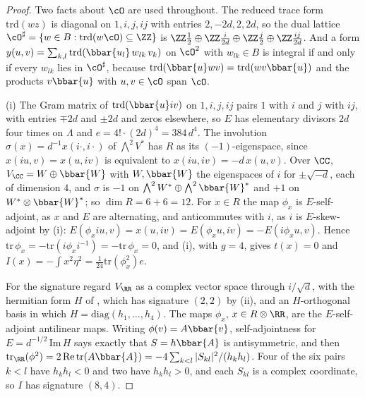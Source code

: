 \begin{proof}
Two facts about $\cO$ are used throughout. The reduced trace form
$\mathrm{trd}(wz)$ is diagonal on $1,i,j,ij$ with entries $2,-2d,2,2d$, so
the dual lattice $\cO^{\sharp}=\{w\in B:\mathrm{trd}(w\cO)\subseteq\ZZ\}$ is
$\ZZ\tfrac12\oplus\ZZ\tfrac{i}{2d}\oplus\ZZ\tfrac{j}{2}\oplus\ZZ\tfrac{ij}{2d}$.
And a form $y(u,v)=\sum_{k,l}\mathrm{trd}(\bbar{u_{l}}\,w_{lk}\,v_{k})$ on
$\cO^{2}$ with $w_{lk}\in B$ is integral if and only if every $w_{lk}$ lies
in $\cO^{\sharp}$, because $\mathrm{trd}(\bbar{u}wv)=\mathrm{trd}(wv\bbar{u})$
and the products $v\bbar{u}$ with $u,v\in\cO$ span $\cO$.

(i) The Gram matrix of $\mathrm{trd}(\bbar{u}iv)$ on $1,i,j,ij$ pairs $1$
with $i$ and $j$ with $ij$, with entries $\mp2d$ and $\pm2d$ and zeros
elsewhere, so $E$ has elementary divisors $2d$ four times on $\Lambda$ and
$e=4!\cdot(2d)^{4}=384\,d^{4}$. The involution $\sigma(x)=d^{-1}x(i\cdot,i\cdot)$
of $\bigwedge^{2}V^{*}$ has $R$ as its $(-1)$-eigenspace, since
$x(iu,v)=x(u,iv)$ is equivalent to $x(iu,iv)=-d\,x(u,v)$. Over $\CC$,
$V_{\CC}=W\oplus\bbar{W}$ with $W,\bbar{W}$ the eigenspaces of $i$ for
$\pm\sqrt{-d}$, each of dimension $4$, and $\sigma$ is $-1$ on
$\bigwedge^{2}W^{*}\oplus\bigwedge^{2}\bbar{W}^{*}$ and $+1$ on
$W^{*}\otimes\bbar{W}^{*}$; so $\dim R=6+6=12$. For $x\in R$ the map
$\phi_{x}$ is $E$-self-adjoint, as $x$ and $E$ are alternating, and
anticommutes with $i$, as $i$ is $E$-skew-adjoint by
(i): $E(\phi_{x}iu,v)=x(u,iv)=E(\phi_{x}u,iv)=-E(i\phi_{x}u,v)$.
Hence $\mathrm{tr}\,\phi_{x}=-\mathrm{tr}(i\phi_{x}i^{-1})=-\mathrm{tr}\,\phi_{x}=0$,
and (i), with $g=4$, gives $t(x)=0$ and
$I(x)=-\int x^{2}\eta^{2}=\tfrac{1}{24}\mathrm{tr}(\phi_{x}^{2})e$.

For the signature regard $V_{\RR}$ as a complex vector space through
$i/\sqrt{d}$, with the hermitian form $H$ of , which has
signature $(2,2)$ by (ii), and an $H$-orthogonal basis in
which $H=\mathrm{diag}(h_{1},\dots,h_{4})$. The maps $\phi_{x}$, $x\in R\otimes\RR$,
are the $E$-self-adjoint antilinear maps. Writing $\phi(v)=A\bbar{v}$,
self-adjointness for $E=d^{-1/2}\,\mathrm{Im}\,H$ says exactly that
$S=h\bbar{A}$ is antisymmetric, and then
$\mathrm{tr}_{\RR}(\phi^{2})=2\,\mathrm{Re}\,\mathrm{tr}(A\bbar{A})
=-4\sum_{k<l}|S_{kl}|^{2}/(h_{k}h_{l})$. Four of the six pairs $k<l$ have
$h_{k}h_{l}<0$ and two have $h_{k}h_{l}>0$, and each $S_{kl}$ is a complex
coordinate, so $I$ has signature $(8,4)$.


\end{proof}
